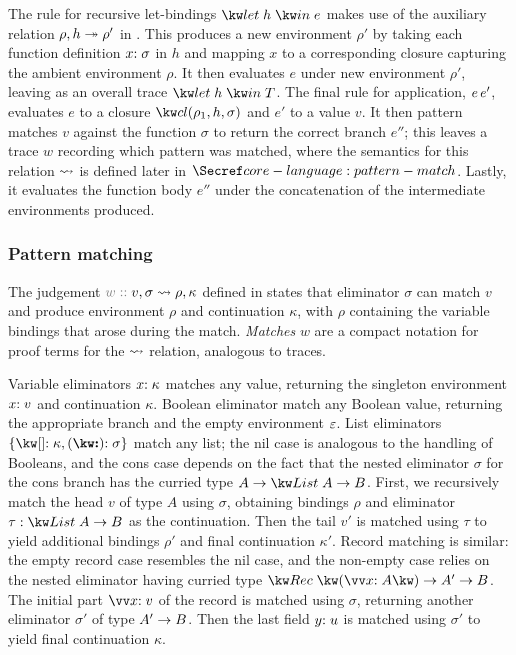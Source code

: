 The rule for recursive let-bindings $\exLetRecMutual{h}{e}$ makes use of the auxiliary relation $\rho, h \twoheadrightarrow \rho'$ in . This produces a new environment $\rho'$ by taking each function definition $x{:}\;\sigma$ in $h$ and mapping $x$ to a corresponding closure capturing the ambient environment $\rho$. It then evaluates $e$ under new environment $\rho'$, leaving as an overall trace $\trLetRecMutual{h}{T}$.  The final rule for application, ${e}\,{e'}$, evaluates $e$ to a closure $\exClosure{\rho_1}{h}{\sigma}$ and $e'$ to a value $v$. It then pattern matches $v$ against the function $\sigma$ to return the correct branch $e''$; this leaves a trace $w$ recording which pattern was matched, where the semantics for this relation $\rightsquigarrow$ is defined later in $\secref{core-language:pattern-match}$. Lastly, it evaluates the function body $e''$ under the concatenation of the intermediate environments produced.

\subsubsection{Pattern matching}
\label{sec:core-language:pattern-match}

The judgement $\explVal{w}{v, \sigma \matchR \rho, \kappa}$ defined in  states that eliminator $\sigma$ can match $v$ and produce environment $\rho$ and continuation $\kappa$, with $\rho$ containing the variable bindings that arose during the match. \emph{Matches} $w$ are a compact notation for proof terms for the $\rightsquigarrow$ relation, analogous to traces.

Variable eliminators ${x}{:}\;{\kappa}$ matches any value, returning the singleton environment $x{:}\;v$ and continuation $\kappa$. Boolean eliminator match any Boolean value, returning the appropriate branch and the empty environment $\varepsilon$. List eliminators $\elimList{\kappa}{\sigma}$ match any list; the nil case is analogous to the handling of Booleans, and the cons case depends on the fact that the nested eliminator $\sigma$ for the cons branch has the curried type $\tyFun{A}{\tyFun{\tyList{A}}{B}}$. First, we recursively match the head $v$ of type $A$ using $\sigma$, obtaining bindings $\rho$ and eliminator $\tau: \tyFun{\tyList{A}}{B}$ as the continuation. Then the tail $v'$ is matched using $\tau$ to yield additional bindings $\rho'$ and final continuation $\kappa'$. Record matching is similar: the empty record case resembles the nil case, and the non-empty case relies on the nested eliminator having curried type $\tyFun{\tyRec{\vec{\bind{x}{A}}}}{\tyFun{A'}{B}}$. The initial part $\vec{\bind{x}{v}}$ of the record is matched using $\sigma$, returning another eliminator $\sigma'$ of type ${A'}\rightarrow{B}$. Then the last field $y{:}\;u$ is matched using $\sigma'$ to yield final continuation $\kappa$.
